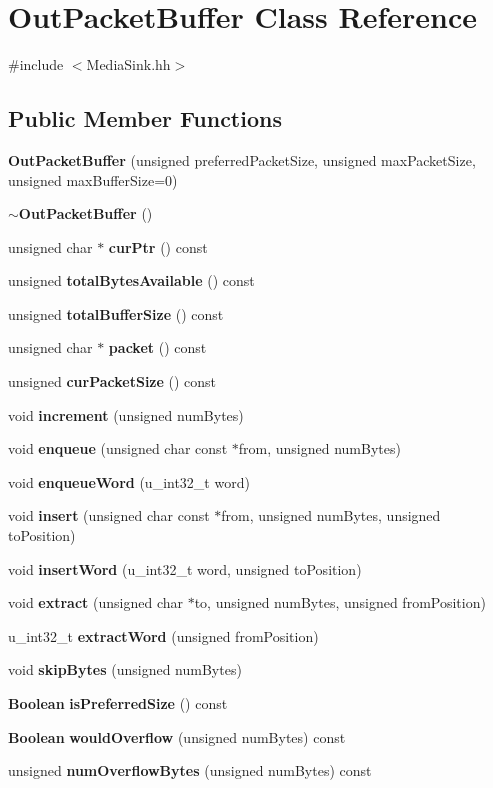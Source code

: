 \section{Out\+Packet\+Buffer Class Reference}
\label{classOutPacketBuffer}


{\ttfamily \#include $<$Media\+Sink.\+hh$>$}

\subsection*{Public Member Functions}
\begin{DoxyCompactItemize}
\item 
{\bf Out\+Packet\+Buffer} (unsigned preferred\+Packet\+Size, unsigned max\+Packet\+Size, unsigned max\+Buffer\+Size=0)
\item 
{\bf $\sim$\+Out\+Packet\+Buffer} ()
\item 
unsigned char $\ast$ {\bf cur\+Ptr} () const 
\item 
unsigned {\bf total\+Bytes\+Available} () const 
\item 
unsigned {\bf total\+Buffer\+Size} () const 
\item 
unsigned char $\ast$ {\bf packet} () const 
\item 
unsigned {\bf cur\+Packet\+Size} () const 
\item 
void {\bf increment} (unsigned num\+Bytes)
\item 
void {\bf enqueue} (unsigned char const $\ast$from, unsigned num\+Bytes)
\item 
void {\bf enqueue\+Word} (u\+\_\+int32\+\_\+t word)
\item 
void {\bf insert} (unsigned char const $\ast$from, unsigned num\+Bytes, unsigned to\+Position)
\item 
void {\bf insert\+Word} (u\+\_\+int32\+\_\+t word, unsigned to\+Position)
\item 
void {\bf extract} (unsigned char $\ast$to, unsigned num\+Bytes, unsigned from\+Position)
\item 
u\+\_\+int32\+\_\+t {\bf extract\+Word} (unsigned from\+Position)
\item 
void {\bf skip\+Bytes} (unsigned num\+Bytes)
\item 
{\bf Boolean} {\bf is\+Preferred\+Size} () const 
\item 
{\bf Boolean} {\bf would\+Overflow} (unsigned num\+Bytes) const 
\item 
unsigned {\bf num\+Overflow\+Bytes} (unsigned num\+Bytes) const 

\end{DoxyCompactItemize}
